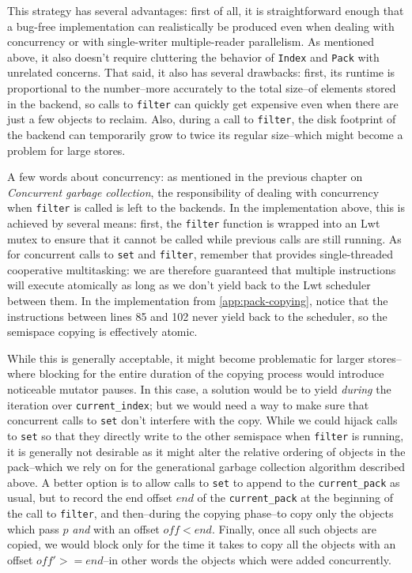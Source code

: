 \bigskip
This strategy has several advantages: first of all, it is straightforward enough that a bug-free implementation can realistically be produced even when dealing with concurrency or with single-writer multiple-reader parallelism. As mentioned above, it also doesn't require cluttering the behavior of \texttt{Index} and \texttt{Pack} with unrelated concerns. That said, it also has several drawbacks: first, its runtime is proportional to the number--more accurately to the total size--of elements stored in the backend, so calls to \texttt{filter} can quickly get expensive even when there are just a few objects to reclaim. Also, during a call to \texttt{filter}, the disk footprint of the backend can temporarily grow to twice its regular size--which might become a problem for large stores.

\bigskip
A few words about concurrency: as mentioned in the previous chapter on \emph{Concurrent garbage collection}, the responsibility of dealing with concurrency when \texttt{filter} is called is left to the backends. In the implementation above, this is achieved by several means: first, the \texttt{filter} function is wrapped into an Lwt mutex to ensure that it cannot be called while previous calls are still running. As for concurrent calls to \texttt{set} and \texttt{filter}, remember that provides single-threaded cooperative multitasking: we are therefore guaranteed that multiple instructions will execute atomically as long as we don't yield back to the Lwt scheduler between them. In the implementation from \cref{app:pack-copying}, notice that the instructions between lines 85 and 102 never yield back to the scheduler, so the semispace copying is effectively atomic.

While this is generally acceptable, it might become problematic for larger stores--where blocking for the entire duration of the copying process would introduce noticeable mutator pauses. In this case, a solution would be to yield \emph{during} the iteration over \texttt{current\_index}; but we would need a way to make sure that concurrent calls to \texttt{set} don't interfere with the copy. While we could hijack calls to \texttt{set} so that they directly write to the other semispace when \texttt{filter} is running, it is generally not desirable as it might alter the relative ordering of objects in the pack--which we rely on for the generational garbage collection algorithm described above. A better option is to allow calls to \texttt{set} to append to the \texttt{current\_pack} as usual, but to record the end offset \(end\) of the \texttt{current\_pack} at the beginning of the call to \texttt{filter}, and then--during the copying phase--to copy only the objects which pass \(p\) \emph{and} with an offset \(off < end\). Finally, once all such objects are copied, we would block only for the time it takes to copy all the objects with an offset \(off' >= end\)--in other words the objects which were added concurrently.

